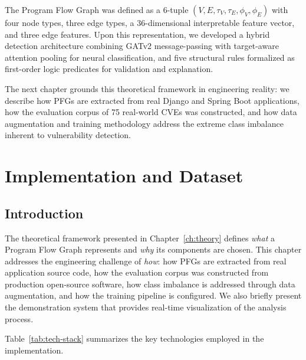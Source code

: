 The Program Flow Graph was defined as a 6-tuple $(V, E, \tau_V, \tau_E, \phi_V, \phi_E)$ with four node types, three edge types, a 36-dimensional interpretable feature vector, and three edge features. Upon this representation, we developed a hybrid detection architecture combining GATv2 message-passing with target-aware attention pooling for neural classification, and five structural rules formalized as first-order logic predicates for validation and explanation.

The next chapter grounds this theoretical framework in engineering reality: we describe how PFGs are extracted from real Django and Spring Boot applications, how the evaluation corpus of 75 real-world CVEs was constructed, and how data augmentation and training methodology address the extreme class imbalance inherent to vulnerability detection.



\chapter{Implementation and Dataset}
\label{ch:implementation}

\section{Introduction}
\label{sec:ch4-intro}

The theoretical framework presented in Chapter~\ref{ch:theory} defines \emph{what} a Program Flow Graph represents and \emph{why} its components are chosen. This chapter addresses the engineering challenge of \emph{how}: how PFGs are extracted from real application source code, how the evaluation corpus was constructed from production open-source software, how class imbalance is addressed through data augmentation, and how the training pipeline is configured. We also briefly present the demonstration system that provides real-time visualization of the analysis process.

Table~\ref{tab:tech-stack} summarizes the key technologies employed in the implementation.

